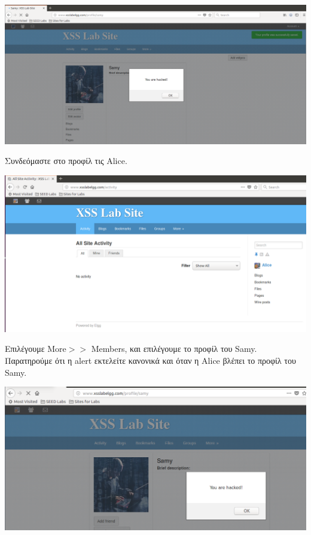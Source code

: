 \begin{center}
			\includegraphics[width=1\textwidth]{image/1.2.PNG}		
\end{center}

\noindent
Συνδεόμαστε στο προφίλ τις Alice.

\begin{center}
			\includegraphics[width=1\textwidth]{image/1.3.PNG}		
\end{center}
\noindent
Επιλέγουμε More$>>$ Members, και επιλέγουμε το προφίλ του Samy.
Παρατηρούμε ότι η alert εκτελείτε κανονικά και όταν η Alice βλέπει
το προφίλ του Samy.

\begin{center}
			\includegraphics[width=1\textwidth]{image/1.4.PNG}		
\end{center}

